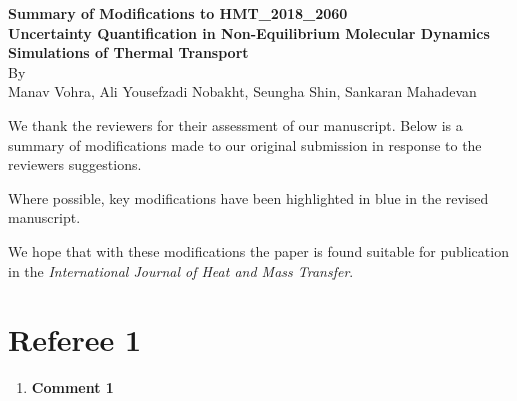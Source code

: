\documentclass[12pt]{article}
\begin{document}
\parskip=6pt

\begin{center}
{\bf Summary of Modifications to HMT\_2018\_2060}\\[6pt]
{\bf Uncertainty Quantification in Non-Equilibrium Molecular Dynamics Simulations of Thermal Transport}\\[6pt]
By \\
Manav Vohra, Ali Yousefzadi Nobakht, Seungha Shin, Sankaran Mahadevan 
\end{center}

\baselineskip=22pt


\vspace*{1in}

We thank the reviewers for their assessment of our manuscript.
Below is a summary of modifications made to our original submission in
response to the reviewers suggestions.

Where possible, key modifications have been highlighted in blue in the revised
manuscript.

We hope that with these modifications
the paper is found suitable for publication in the {\it International Journal of Heat and Mass Transfer}.

\clearpage

\section*{Referee 1}
\begin{enumerate}[leftmargin=*,itemsep=24pt]
\item \textbf{Comment 1}


\end{enumerate}


%
%
\end{document}

